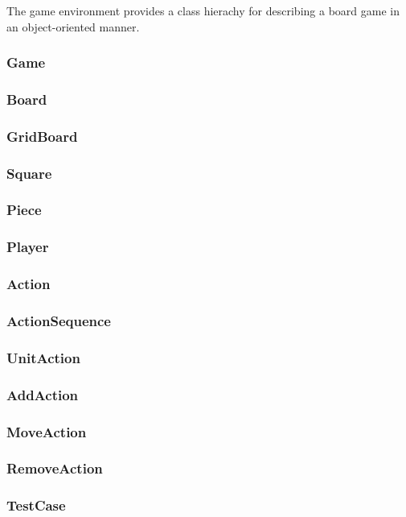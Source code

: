 The game environment provides a class hierachy for describing a board game in an object-oriented manner.

\subsubsection{Game}

\subsubsection{Board}

\subsubsection{GridBoard}

\subsubsection{Square}

\subsubsection{Piece}

\subsubsection{Player}

\subsubsection{Action}

\subsubsection{ActionSequence}

\subsubsection{UnitAction}

\subsubsection{AddAction}

\subsubsection{MoveAction}

\subsubsection{RemoveAction}

\subsubsection{TestCase}
